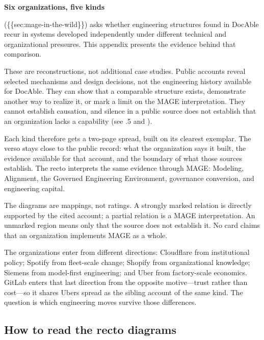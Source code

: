 
\textbf{Six organizations, five kinds}

 (\{\{sec:mage-in-the-wild\}\}) asks whether engineering structures found in DocAble recur in systems developed independently under different technical and organizational pressures. This appendix presents the evidence behind that comparison.

These are reconstructions, not additional case studies. Public accounts reveal selected mechanisms and design decisions, not the engineering history available for DocAble. They can show that a comparable structure exists, demonstrate another way to realize it, or mark a limit on the MAGE interpretation. They cannot establish causation, and silence in a public source does not establish that an organization lacks a capability (see .5 and ).

Each kind therefore gets a two-page spread, built on its clearest exemplar. The verso stays close to the public record: what the organization says it built, the evidence available for that account, and the boundary of what those sources establish. The recto interprets the same evidence through MAGE: Modeling, Alignment, the Governed Engineering Environment, governance conversion, and engineering capital.

The diagrams are mappings, not ratings. A strongly marked relation is directly supported by the cited account; a partial relation is a MAGE interpretation. An unmarked region means only that the source does not establish it. No card claims that an organization implements MAGE as a whole.

The organizations enter from different directions: Cloudflare from institutional policy; Spotify from fleet-scale change; Shopify from organizational knowledge; Siemens from model-first engineering; and Uber from factory-scale economics. GitLab enters that last direction from the opposite motive---trust rather than cost---so it shares Uber\textquotesingle s spread as the sibling account of the same kind. The question is which engineering moves survive those differences.

\subsection{How to read the recto diagrams}\label{heading:how-to-read-the-recto-diagrams}

